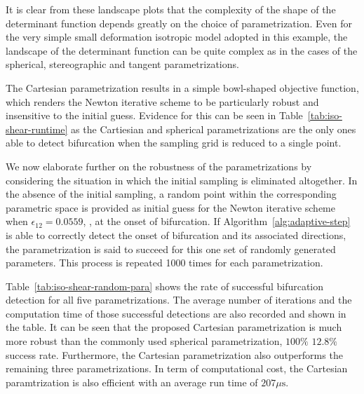 \documentclass[12pt]{article}
\numberwithin{equation}{section}
\begin{document}
It is clear from these landscape plots that the complexity of the
shape of the determinant function depends greatly on the choice of
parametrization. Even for the very simple small deformation isotropic
model adopted in this example, the landscape of the determinant
function can be quite complex as in the cases of the spherical,
stereographic and tangent parametrizations.

The Cartesian parametrization results in a simple bowl-shaped
objective function, which renders the Newton iterative scheme to be
particularly robust and insensitive to the initial guess. Evidence for
this can be seen in Table~\ref{tab:iso-shear-runtime} as the
Cartiesian and spherical parametrizations are the only ones able to
detect bifurcation when the sampling grid is reduced to a single
point.

We now elaborate further on the robustness of the parametrizations by
considering the situation in which the initial sampling is eliminated
altogether. In the absence of the initial sampling, a random point
within the corresponding parametric space is provided as initial guess
for the Newton iterative scheme when $\epsilon_{12}=0.0559$, \ie, at
the onset of bifurcation. If Algorithm~\ref{alg:adaptive-step} is able
to correctly detect the onset of bifurcation and its associated
directions, the parametrization is said to succeed for this one set of
randomly generated parameters. This process is repeated 1000 times for
each parametrization.

Table~\ref{tab:iso-shear-random-para} shows the rate of successful
bifurcation detection for all five parametrizations. The average
number of iterations and the computation time of those successful
detections are also recorded and shown in the table. It can be seen
that the proposed Cartesian parametrization is much more robust than
the commonly used spherical parametrization, \cf $100\%$ \vs $12.8\%$
success rate. Furthermore, the Cartesian parametrization also
outperforms the remaining three parametrizations. In term of
computational cost, the Cartesian paramtrization is also efficient
with an average run time of $207\mu\text{s}$.
\end{document}
